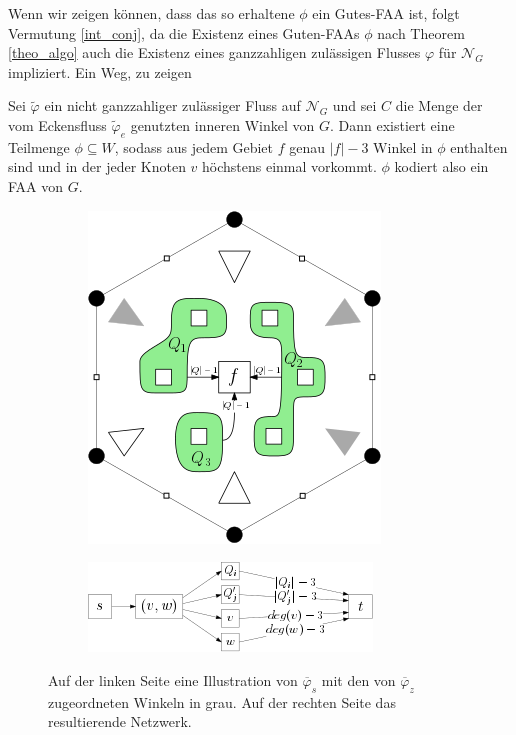 Wenn wir zeigen können, dass das so erhaltene $\phi$ ein Gutes-FAA ist, folgt Vermutung \ref{int_conj}, da die Existenz eines Guten-FAAs $\phi$ nach Theorem \ref{theo_algo} auch die Existenz eines ganzzahligen zulässigen Flusses $\varphi$ für $\mathcal{N}_G$ impliziert. Ein Weg, zu zeigen 

\begin{lemma}\label{lem_schnyder}
Sei $\tilde{\varphi}$ ein nicht ganzzahliger zulässiger Fluss auf $\mathcal{N}_G$ und sei $C$ die Menge der vom Eckensfluss $\tilde{\varphi}_e$ genutzten inneren Winkel von $G$. Dann existiert eine Teilmenge $\phi\subseteq W$, sodass aus jedem Gebiet $f$ genau $|f|-3$ Winkel in $\phi$ enthalten sind und in der jeder Knoten $v$ höchstens einmal vorkommt. $\phi$ kodiert also ein FAA von $G$.
\end{lemma}

\begin{figure}
\centering
\begin{subfigure}{.4\textwidth}
  \centering
  \includegraphics[width=0.9\linewidth]{6_face.png}
\end{subfigure}%
\begin{subfigure}{.6\textwidth}
  \centering
  \includegraphics[width=0.9\linewidth]{schnyder_flow_non_int.png}
\end{subfigure}
\caption{Auf der linken Seite eine Illustration von $\overline{\varphi}_s$ mit den von $\overline{\varphi}_z$ zugeordneten Winkeln in grau. Auf der rechten Seite das resultierende Netzwerk.}
\end{figure}

